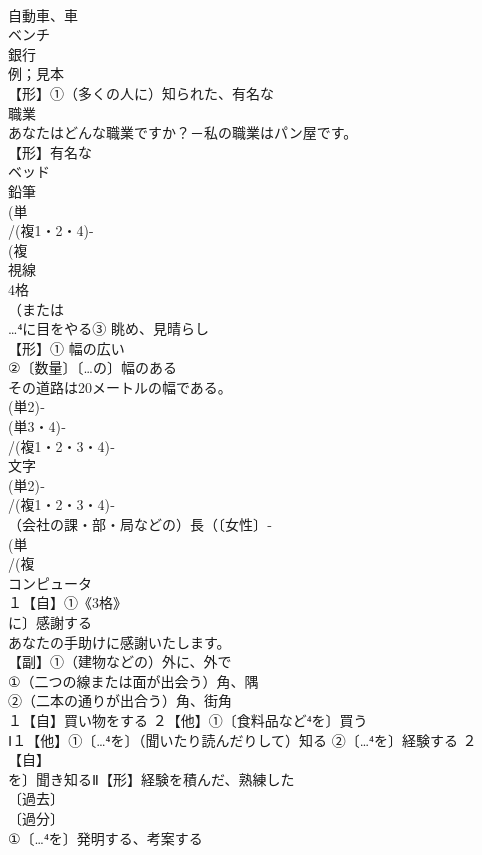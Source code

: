 \documentclass[8pt]{extreport}
\begin{document}
\begin{CJK}{UTF8}{min}
\\	自動車、車
\\	ベンチ
\\	銀行
\\	例；見本
\\	【形】①（多くの人に）知られた、有名な
\\	職業
\\	あなたはどんな職業ですか？－私の職業はパン屋です。
\\	【形】有名な 
\\	ベッド 
\\	鉛筆
\\	(単
\\	/(複1・2・4)-
\\	(複
\\	視線 
\\	4格 
\\	（または
\\	…⁴に目をやる③ 眺め、見晴らし
\\	【形】① 幅の広い 
\\	②〔数量〕〔…の〕幅のある 
\\	その道路は20メートルの幅である。
\\	(単2)‐
\\	(単3・4)‐
\\	/(複1・2・3・4)‐
\\	文字
\\	(単2)‐
\\	/(複1・2・3・4)‐
\\	（会社の課・部・局などの）長（〔女性〕‐
\\	(単
\\	/(複
\\	コンピュータ
\\	１【自】①《3格》
\\	に〕感謝する 
\\	あなたの手助けに感謝いたします。
\\	【副】①（建物などの）外に、外で
\\	①（二つの線または面が出会う）角、隅
\\	②（二本の通りが出合う）角、街角
\\	１【自】買い物をする ２【他】①〔食料品など⁴を〕買う
\\	Ⅰ１【他】①〔…⁴を〕（聞いたり読んだりして）知る ②〔…⁴を〕経験する ２【自】
\\	を〕聞き知るⅡ【形】経験を積んだ、熟練した
\\	〔過去〕
\\	〔過分〕
\\	①〔…⁴を〕発明する、考案する

\end{CJK}
\end{document}
